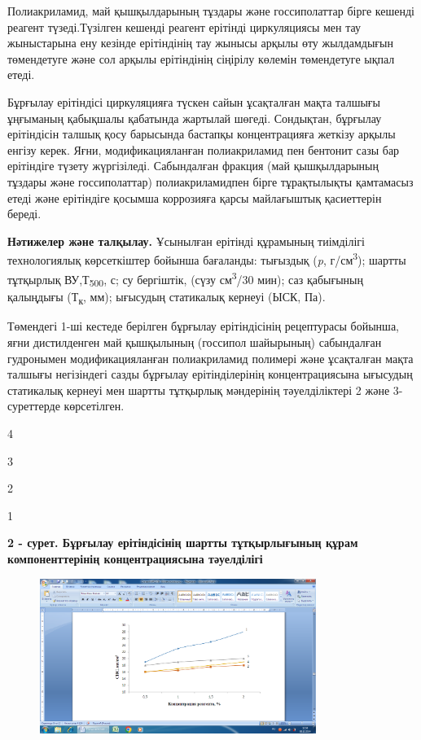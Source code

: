 \begin{multicols}{2}
Полиакриламид, май қышқылдарының тұздары және госсиполаттар бірге
кешенді реагент түзеді.Түзілген кешенді реагент ерітінді циркуляциясы
мен тау жыныстарына ену кезінде ерітіндінің тау жынысы арқылы өту
жылдамдығын төмендетуге және сол арқылы ерітіндінің сіңірілу көлемін
төмендетуге ықпал етеді.

Бұрғылау ерітіндісі циркуляцияға түскен сайын ұсақталған мақта талшығы
ұңғыманың қабықшалы қабатында жартылай шөгеді. Сондықтан, бұрғылау
ерітіндісін талшық қосу барысында бастапқы концентрацияға жеткізу арқылы
енгізу керек. Яғни, модификацияланған полиакриламид пен бентонит сазы
бар ерітіндіге түзету жүргізіледі. Сабындалған фракция (май
қышқылдарының тұздары және госсиполаттар) полиакриламидпен бірге
тұрақтылықты қамтамасыз етеді және ерітіндіге қосымша коррозияға қарсы
майлағыштық қасиеттерін береді.

{\bfseries Нәтижелер және талқылау.} Ұсынылған ерітінді құрамының
тиімділігі технологиялық көрсеткіштер бойынша бағаланды: тығыздық
(\emph{p}, г/см\textsuperscript{3}); шартты тұтқырлық
ВУ,Т\textsubscript{500}, с; су бергіштік, (сүзу см\textsuperscript{3}/30
мин); саз қабығының қалыңдығы (Т\textsubscript{к}, мм); ығысудың
статикалық кернеуі (ЫСК, Па).

Төмендегі 1-ші кестеде берілген бұрғылау ерітіндісінің рецептурасы
бойынша, яғни дистилденген май қышқылының (госсипол шайырының)
сабындалған гудронымен модификацияланған полиакриламид полимері және
ұсақталған мақта талшығы негізіндегі сазды бұрғылау ерітінділерінің
концентрациясына ығысудың статикалық кернеуі мен шартты тұтқырлық
мәндерінің тәуелділіктері 2 және 3-суреттерде көрсетілген.
\end{multicols}

4

3

2

1

{\bfseries 2 - сурет. Бұрғылау ерітіндісінің шартты тұтқырлығының құрам компоненттерінің концентрациясына тәуелділігі}


\begin{figure}[H]
	\centering
	\includegraphics[width=0.8\textwidth]{media/gorn/image46}
	\caption*{}
\end{figure}



